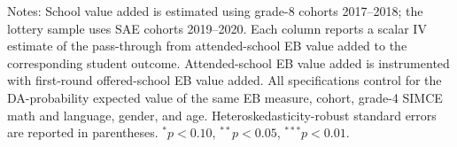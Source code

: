 \begin{table}[!htbp]
\centering
\caption{Main scalar school-value IV estimates using EB-shrunken value added (VA 2017--2018; SAE 2019--2020)}
\label{tab:scalar-school-value-iv-main-seven-eb-va-2017--2018-sae-2019-2020}
\par\medskip
\footnotesize
\begin{minipage}{\textwidth}
Notes: School value added is estimated using grade-8 cohorts 2017--2018; the lottery sample uses SAE cohorts 2019--2020. Each column reports a scalar IV estimate of the pass-through from attended-school EB value added to the corresponding student outcome. Attended-school EB value added is instrumented with first-round offered-school EB value added. All specifications control for the DA-probability expected value of the same EB measure, cohort, grade-4 SIMCE math and language, gender, and age. Heteroskedasticity-robust standard errors are reported in parentheses. $^{*}p<0.10$, $^{**}p<0.05$, $^{***}p<0.01$.
\end{minipage}
\end{table}
